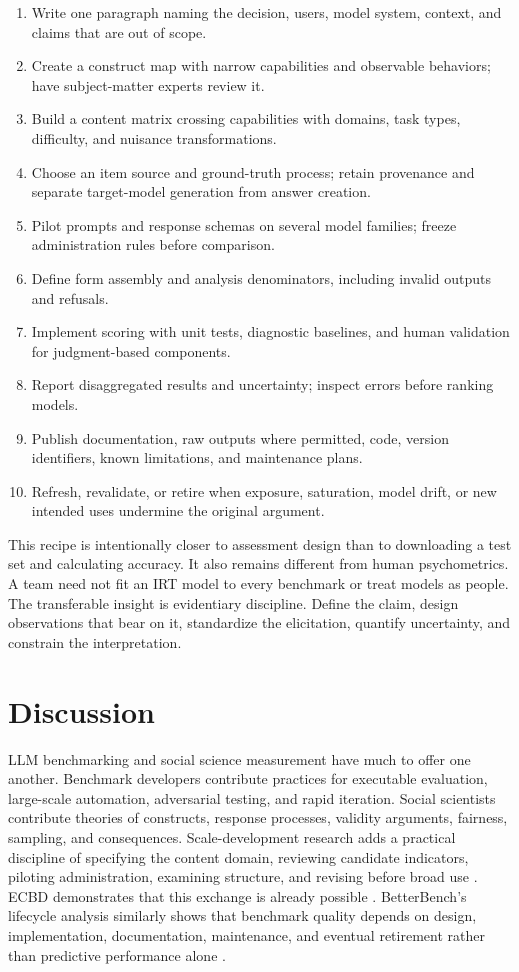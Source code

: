 \documentclass[12pt]{article}
\begin{document}
\begin{enumerate}
\item Write one paragraph naming the decision, users, model system, context, and claims that are out of scope.
\item Create a construct map with narrow capabilities and observable behaviors; have subject-matter experts review it.
\item Build a content matrix crossing capabilities with domains, task types, difficulty, and nuisance transformations.
\item Choose an item source and ground-truth process; retain provenance and separate target-model generation from answer creation.
\item Pilot prompts and response schemas on several model families; freeze administration rules before comparison.
\item Define form assembly and analysis denominators, including invalid outputs and refusals.
\item Implement scoring with unit tests, diagnostic baselines, and human validation for judgment-based components.
\item Report disaggregated results and uncertainty; inspect errors before ranking models.
\item Publish documentation, raw outputs where permitted, code, version identifiers, known limitations, and maintenance plans.
\item Refresh, revalidate, or retire when exposure, saturation, model drift, or new intended uses undermine the original argument.
\end{enumerate}

This recipe is intentionally closer to assessment design than to downloading a test set and calculating accuracy. It also remains different from human psychometrics. A team need not fit an IRT model to every benchmark or treat models as people. The transferable insight is evidentiary discipline. Define the claim, design observations that bear on it, standardize the elicitation, quantify uncertainty, and constrain the interpretation.

\section{Discussion}

LLM benchmarking and social science measurement have much to offer one another. Benchmark developers contribute practices for executable evaluation, large-scale automation, adversarial testing, and rapid iteration. Social scientists contribute theories of constructs, response processes, validity arguments, fairness, sampling, and consequences. Scale-development research adds a practical discipline of specifying the content domain, reviewing candidate indicators, piloting administration, examining structure, and revising before broad use \citep{boateng2018,simms2008}. ECBD demonstrates that this exchange is already possible \citep{liu2024ecbd}. BetterBench's lifecycle analysis similarly shows that benchmark quality depends on design, implementation, documentation, maintenance, and eventual retirement rather than predictive performance alone \citep{reuel2024betterbench}.
\end{document}

